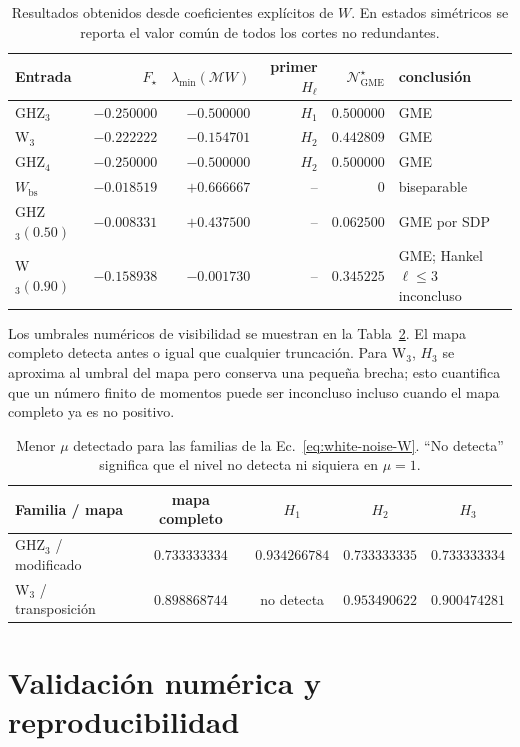 \documentclass[11pt,a4paper]{article}
\newcommand{\Fstar}{F_{\star}}
\newcommand{\Ngstar}{\mathcal N_{\mathrm{GME}}^{\star}}
\theoremstyle{definition}
\begin{document}
\begin{table}[ht]
\centering
\caption{Resultados obtenidos desde coeficientes explícitos de $W$. En estados
simétricos se reporta el valor común de todos los cortes no redundantes.}
\label{tab:examples}
\small
\begin{tabular}{lrrrrl}
\toprule
Entrada & $\Fstar$ & $\lambda_{\min}(\mathcal M W)$ & primer $H_\ell$ & $\Ngstar$ & conclusión \\
\midrule
GHZ$_3$ & $-0.250000$ & $-0.500000$ & $H_1$ & $0.500000$ & GME \\
W$_3$ & $-0.222222$ & $-0.154701$ & $H_2$ & $0.442809$ & GME \\
GHZ$_4$ & $-0.250000$ & $-0.500000$ & $H_2$ & $0.500000$ & GME \\
$W_{\mathrm{bs}}$ & $-0.018519$ & $+0.666667$ & -- & $0$ & biseparable \\
GHZ$_3(0.50)$ & $-0.008331$ & $+0.437500$ & -- & $0.062500$ & GME por SDP \\
W$_3(0.90)$ & $-0.158938$ & $-0.001730$ & -- & $0.345225$ & GME; Hankel $\ell\leq3$ inconcluso \\
\bottomrule
\end{tabular}
\end{table}

Los umbrales numéricos de visibilidad se muestran en la
Tabla~\ref{tab:thresholds}. El mapa completo detecta antes o igual que cualquier
truncación. Para W$_3$, $H_3$ se aproxima al umbral del mapa pero conserva una
pequeña brecha; esto cuantifica que un número finito de momentos puede ser
inconcluso incluso cuando el mapa completo ya es no positivo.

\begin{table}[ht]
\centering
\caption{Menor $\mu$ detectado para las familias de la
Ec.~\eqref{eq:white-noise-W}. ``No detecta'' significa que el nivel no detecta
ni siquiera en $\mu=1$.}
\label{tab:thresholds}
\small
\begin{tabular}{lcccc}
\toprule
Familia / mapa & mapa completo & $H_1$ & $H_2$ & $H_3$ \\
\midrule
GHZ$_3$ / modificado & $0.733333334$ & $0.934266784$ & $0.733333335$ & $0.733333334$ \\
W$_3$ / transposición & $0.898868744$ & no detecta & $0.953490622$ & $0.900474281$ \\
\bottomrule
\end{tabular}
\end{table}

\section{Validación numérica y reproducibilidad}
\end{document}
